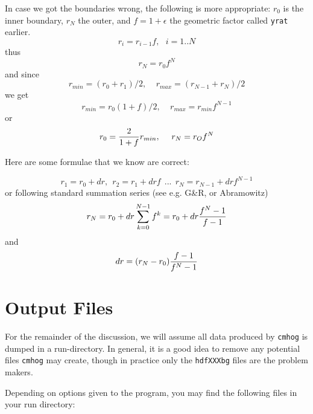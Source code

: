 \documentclass[10pt,dvips]{article}
\begin{document}
In case we got the boundaries wrong, the following is more appropriate: 
$r_0$ is the inner boundary, $r_N$ the outer, and $f=1+\epsilon$ the
geometric factor called {\tt yrat} earlier.
$$
r_i = r_{i-1} f, ~~~ i=1..N
$$
thus
$$
r_N = r_0 f^N
$$
and since
$$
r_{min} = (r_0+r_1)/2,     ~~~~~ r_{max} = (r_{N-1}+r_N)/2
$$
we get
$$
r_{min} = r_0 (1+f)/2,   ~~~~~ r_{max} = r_{min} f^{N-1}
$$
or
$$
r_0 = { 2 \over  { 1+f}}  r_{min}, ~~~~  r_N = r_O f^N
$$


Here are some formulae that we know are correct:

$$
      r_1 = r_0 + dr, ~~  r_2 = r_1 + dr f  ~~...~~ r_N = r_{N-1} + dr f^{N-1}
$$
or following standard summation series (see e.g. G\&R, or Abramowitz)
$$
	r_N = r_0 + dr \sum_{k=0}^{N-1}{f^k} = r_0 + dr { {f^N-1} \over { f - 1 }}
$$
and
$$
     dr =  (r_N - r_0) { {f-1} \over { f^N - 1 }}
$$



\section{Output Files}

For the remainder of the discussion, we will assume all data produced
by {\tt cmhog} is dumped in a run-directory. In general, it is a good
idea to remove any potential files {\tt cmhog} may create, though
in practice only the {\tt hdfXXXbg} files are the problem makers.

Depending on options given to the program, you may find the following files
in your run directory:
\end{document}
